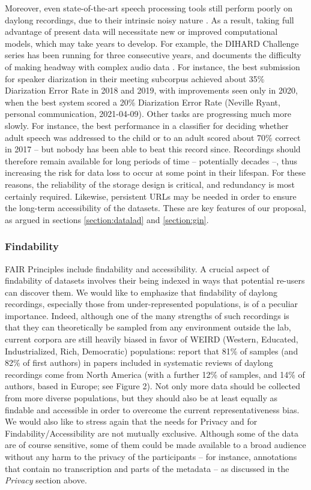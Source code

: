 \documentclass[smallextended]{svjour3}       %
\begin{document}
Moreover, even state-of-the-art speech processing tools still perform poorly on daylong recordings, due to their intrinsic noisy nature \citep{casillas2019step}. As a result, taking full advantage of present data will necessitate new or improved computational models, which may take years to develop. For example, the DIHARD Challenge series has been running for three consecutive years, and documents the difficulty of making headway with complex audio data \citep{ryant2018first,ryant2019second,ryant2020third}. For instance, the best submission for speaker diarization in their meeting subcorpus achieved about 35\% Diarization Error Rate in 2018 and 2019, with improvements seen only in 2020, when the best system scored a 20\% Diarization Error Rate (Neville Ryant, personal communication, 2021-04-09). Other tasks are progressing much more slowly. For instance, the best performance in a classifier for deciding whether adult speech was addressed to the child or to an adult scored about 70\% correct in 2017 \citep{schuller2017interspeech} -- but nobody has been able to beat this record since. Recordings should therefore remain available for long periods of time -- potentially decades --, thus increasing the risk for data loss to occur at some point in their lifespan. For these reasons, the reliability of the storage design is critical, and redundancy is most certainly required. Likewise, persistent URLs may be needed in order to ensure the long-term accessibility of the datasets. These are key features of our proposal, as argued in sections \ref{section:datalad} and \ref{section:gin}.

\subsubsection*{Findability}

FAIR Principles include findability and accessibility. A crucial aspect of findability of datasets involves their being indexed in ways that potential re-users can discover them.  We would like to emphasize that findability of daylong recordings, especially those from under-represented populations, is of a peculiar importance. Indeed, although one of the many strengths of such recordings is that they can theoretically be sampled from any environment outside the lab, current corpora are still heavily biased in favor of WEIRD (Western, Educated, Industrialized, Rich, Democratic) populations: \cite{cychosz2021using} report that 81\% of samples (and 82\% of first authors) in papers included in systematic reviews of daylong recordings come from North America (with a further 12\% of samples, and 14\% of authors, based in Europe; see Figure 2). Not only more data should be collected from more diverse populations, but they should also be at least equally as findable and accessible in order to overcome the current representativeness bias. We would also like to stress again that the needs for Privacy and for Findability/Accessibility are not mutually exclusive. Although some of the data are of course sensitive, some of them could be made available to a broad audience without any harm to the privacy of the participants -- for instance, annotations that contain no transcription and parts of the metadata -- as discussed in the \textit{Privacy} section above.
\end{document}
